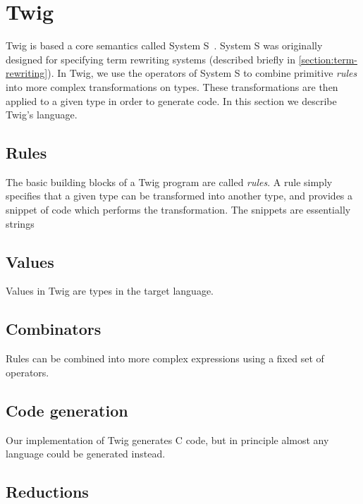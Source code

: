
\section{Twig}


Twig is based a core semantics called System S~\cite{Visser:1998p333}. System
S was originally designed for specifying term rewriting systems (described
briefly in \ref{section:term-rewriting}). In Twig, we use the operators of
System S to combine primitive \emph{rules} into more complex transformations
on types. These transformations are then applied to a given type in order to
generate code. In this section we describe Twig's language.

\subsection{Rules}

The basic building blocks of a Twig program are called \emph{rules}. A rule simply specifies that a given type can be transformed into another type, and provides a snippet of code which performs the transformation. The snippets are essentially strings

\subsection{Values}

Values in Twig are types in the target language.

\subsection{Combinators}

Rules can be combined into more complex expressions using a fixed set of
operators.

\subsection{Code generation}

Our implementation of Twig generates C code, but in principle almost any
language could be generated instead.

\subsection{Reductions}

